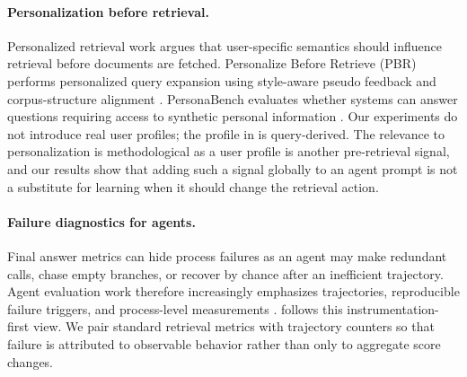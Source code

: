 \paragraph{Personalization before retrieval.}
Personalized retrieval work argues that user-specific semantics should influence retrieval before documents are fetched. Personalize Before Retrieve (PBR) performs personalized query expansion using style-aware pseudo feedback and corpus-structure alignment \citep{zhang2025pbr}. PersonaBench evaluates whether systems can answer questions requiring access to synthetic personal information \citep{tan2025personabench}. Our experiments do not introduce real user profiles; the profile in \tb is query-derived. The relevance to personalization is methodological as a user profile is another pre-retrieval signal, and our results show that adding such a signal globally to an agent prompt is not a substitute for learning when it should change the retrieval action.

\paragraph{Failure diagnostics for agents.}
Final answer metrics can hide process failures as an agent may make redundant calls, chase empty branches, or recover by chance after an inefficient trajectory. Agent evaluation work therefore increasingly emphasizes trajectories, reproducible failure triggers, and process-level measurements \citep{liu2023agentbench,xie2024osworld}. \tb follows this instrumentation-first view. We pair standard retrieval metrics with trajectory counters so that failure is attributed to observable behavior rather than only to aggregate score changes.
